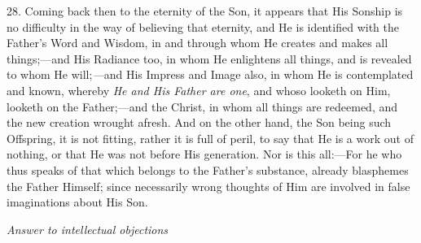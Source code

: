 28. Coming back then to the
eternity of the Son, it appears that His Sonship is no difficulty in
the way of believing that eternity, and He is identified with the
Father's Word and Wisdom, in and through whom He creates and makes all
things;—and His Radiance too, in whom He enlightens all things, and
is revealed to whom He will;\emph{—}and His Impress and Image also,
in whom He is contemplated and known, whereby \emph{He and His Father are
one}, and whoso looketh on Him, looketh on the Father;—and the
Christ, in whom all things are redeemed, and the new creation wrought
afresh. And on the other hand, the Son being such Offspring, it is not
fitting, rather it is full of peril, to say that He is a work out of
nothing, or that He was not before His generation. Nor is this
all:—For he who thus speaks of that which belongs to the Father's
substance, already blasphemes the Father Himself; since necessarily
wrong thoughts of Him are involved in false imaginations about His
Son.


\emph{Answer
to intellectual objections}


